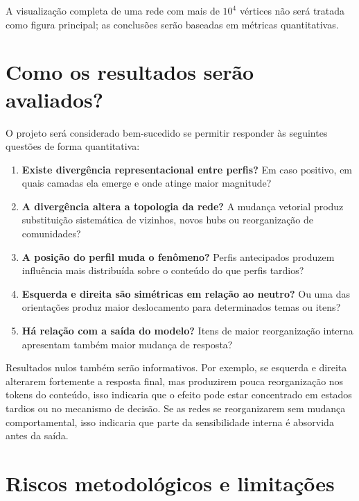 \documentclass[11pt,a4paper]{article}
\begin{document}
A visualização completa de uma rede com mais de $10^4$ vértices não será tratada como figura principal; as conclusões serão baseadas em métricas quantitativas.

\section{Como os resultados serão avaliados?}

O projeto será considerado bem-sucedido se permitir responder às seguintes questões de forma quantitativa:

\begin{enumerate}
    \item \textbf{Existe divergência representacional entre perfis?} Em caso positivo, em quais camadas ela emerge e onde atinge maior magnitude?

    \item \textbf{A divergência altera a topologia da rede?} A mudança vetorial produz substituição sistemática de vizinhos, novos hubs ou reorganização de comunidades?

    \item \textbf{A posição do perfil muda o fenômeno?} Perfis antecipados produzem influência mais distribuída sobre o conteúdo do que perfis tardios?

    \item \textbf{Esquerda e direita são simétricas em relação ao neutro?} Ou uma das orientações produz maior deslocamento para determinados temas ou itens?

    \item \textbf{Há relação com a saída do modelo?} Itens de maior reorganização interna apresentam também maior mudança de resposta?
\end{enumerate}

Resultados nulos também serão informativos. Por exemplo, se esquerda e direita alterarem fortemente a resposta final, mas produzirem pouca reorganização nos tokens do conteúdo, isso indicaria que o efeito pode estar concentrado em estados tardios ou no mecanismo de decisão. Se as redes se reorganizarem sem mudança comportamental, isso indicaria que parte da sensibilidade interna é absorvida antes da saída.

\section{Riscos metodológicos e limitações}
\end{document}
